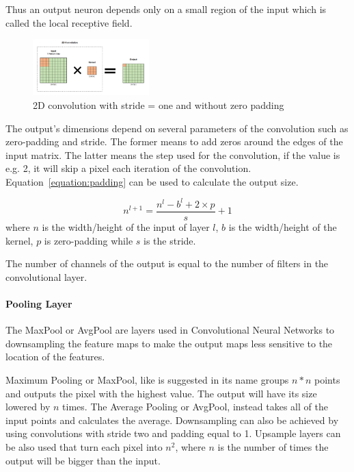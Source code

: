 \documentclass[conference]{IEEEtran}
\begin{document}
Thus an output neuron depends only on a small region of the input which is
called the local receptive field.

\begin{figure}[!htb]
    \centering
    \includegraphics[width=0.4\textwidth]{Figures/conv.png}
    \caption{2D convolution with stride = one and without zero padding}
    \label{Cl}
\end{figure} 


The output's dimensions depend on several parameters of the convolution such as
zero-padding and stride. The former means to add zeros around the edges of the
input matrix. The latter means the step used for the convolution, if the value
is e.g. 2, it will skip a pixel each iteration of the convolution.
Equation~\ref{equation:padding} can be used to calculate the output size.

\begin{equation} \label{equation:padding}
     n^{l+1} = \frac{n^{l}- b^{l}+2 \times p}{s} + 1
\end{equation}
where $n$ is the width/height of the input of layer $l$, $ b$ is the
width/height of the kernel, $p$ is zero-padding while $s$ is the stride.

The number of channels of the output is equal to the number of filters in the
convolutional layer.


\paragraph{Pooling Layer}

The MaxPool or AvgPool are layers used in Convolutional Neural Networks to
downsampling the feature maps to make the output maps less sensitive to the
location of the features.

Maximum Pooling or MaxPool, like is suggested in its name groups $ n * n $
points and outputs the pixel with the highest value.  The output will have its size
lowered by $n$ times.  The Average Pooling or AvgPool, instead takes all of
the input points and calculates the average. Downsampling can also be achieved
by using convolutions with stride two and padding equal to 1.  Upsample layers can
be also used that turn each pixel into $n^{2}$, where $n$ is the number of times
the output will be bigger than the input.
\end{document}

